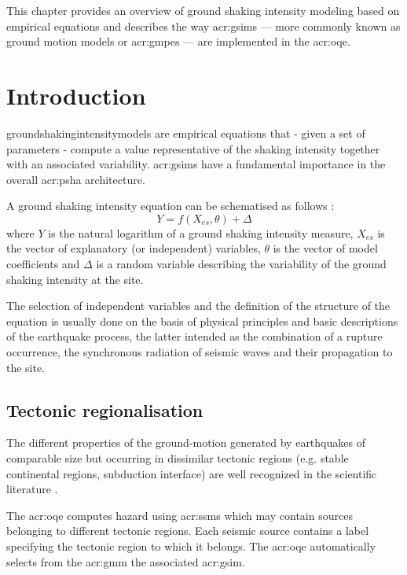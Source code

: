This chapter provides an overview of ground shaking intensity modeling based 
on empirical equations and describes the way \glspl{acr:gsim} --- more commonly 
known as ground motion models or \glspl{acr:gmpe} --- are implemented in the 
\gls{acr:oqe}.
%
\section{Introduction}
%
\Glspl{groundshakingintensitymodel} are empirical equations that - given a 
set of parameters - compute a value representative of the shaking 
intensity together with an associated variability. 
%
\glspl{acr:gsim} have a fundamental importance in the overall \gls{acr:psha} 
architecture.

A ground shaking intensity equation can be schematised as follows 
\parencite{alatik2010}: 
\begin{equation}
Y = f(X_{es},\theta)+\Delta
\end{equation}
where $Y$ is the natural logarithm of a ground shaking intensity measure, 
$X_{es}$ is the vector of explanatory (or independent) variables, $\theta$ 
is the vector of model coefficients and $\Delta$ is a random variable 
describing the variability of the ground shaking intensity at the site.

The selection of independent variables and the definition of the structure 
of the equation is usually done on the basis of physical principles and 
basic descriptions of the earthquake process, the latter
intended as the combination of a rupture occurrence, the synchronous 
radiation of seismic waves and their propagation to the site.
%
\subsection{Tectonic regionalisation}
The different properties of the ground-motion generated by earthquakes 
of comparable size but occurring in dissimilar tectonic regions (e.g. 
stable continental regions, subduction interface) are well recognized in 
the scientific literature \parencite{abrahamson1997}.

The \gls{acr:oqe} computes hazard using \glspl{acr:ssm} which may contain 
sources belonging to different tectonic regions. 
%
Each seismic source contains a label specifying 
the tectonic region to which it belongs. The \gls{acr:oqe} automatically 
selects from the \gls{acr:gmm} the associated \gls{acr:gsim}.

